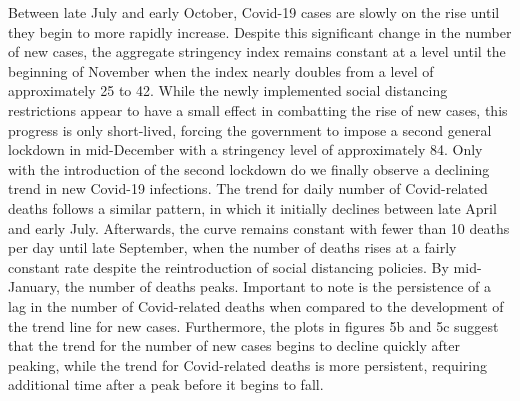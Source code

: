 Between late July and early October, Covid-19 cases are slowly on the rise until they begin to more rapidly increase. Despite this significant change in the number of new cases, the aggregate stringency index remains constant at a level until the beginning of November when the index nearly doubles from a level of approximately 25 to 42. While the newly implemented social distancing restrictions appear to have a small effect in combatting the rise of new cases, this progress is only short-lived, forcing the government to impose a second general lockdown in mid-December with a stringency level of approximately 84. Only with the introduction of the second lockdown do we finally observe a declining trend in new Covid-19 infections. The trend for daily number of Covid-related deaths follows a similar pattern, in which it initially declines between late April and early July. Afterwards, the curve remains constant with fewer than 10 deaths per day until late September, when the number of deaths rises at a fairly constant rate despite the reintroduction of social distancing policies. By mid-January, the number of deaths peaks. Important to note is the persistence of a lag in the number of Covid-related deaths when compared to the development of the trend line for new cases. Furthermore, the plots in figures 5b and 5c suggest that the trend for the number of new cases begins to decline quickly after peaking, while the trend for Covid-related deaths is more persistent, requiring additional time after a peak before it begins to fall.

